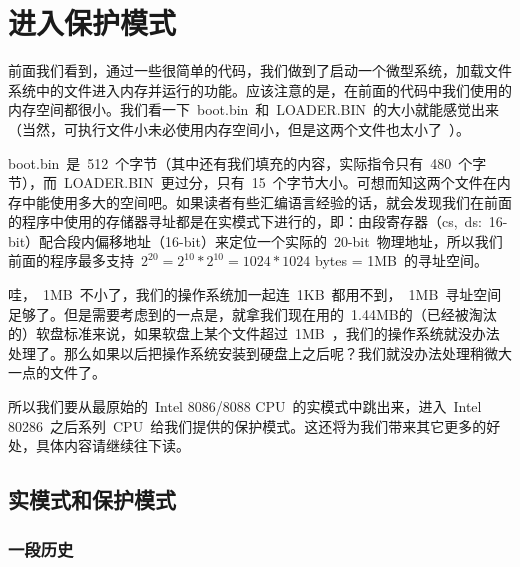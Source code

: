\chapter{进入保护模式} \label{CHpm}

前面我们看到，通过一些很简单的代码，我们做到了启动一个微型系统，加载文件系统中的文件进入内存并运行的功能。应该注意的是，在前面的代码中我们使用的内存空间都很小。我们看一下~boot.bin~和~LOADER.BIN~的大小就能感觉出来（当然，可执行文件小未必使用内存空间小，但是这两个文件也太小了~\smiley）。


boot.bin~是~512~个字节（其中还有我们填充的内容，实际指令只有~480~个字节），而~LOADER.BIN~更过分，只有~15~个字节大小。可想而知这两个文件在内存中能使用多大的空间吧。如果读者有些汇编语言经验的话，就会发现我们在前面的程序中使用的存储器寻址都是在实模式下进行的，即：由段寄存器（cs,~ds:~16-bit）配合段内偏移地址（16-bit）来定位一个实际的~20-bit~物理地址，所以我们前面的程序最多支持~$2^{20} = 2^{10}*2^{10} = 1024*1024$ bytes = 1MB~的寻址空间。

哇，~1MB~不小了，我们的操作系统加一起连~1KB~都用不到，~1MB~寻址空间足够了。但是需要考虑到的一点是，就拿我们现在用的~1.44MB的（已经被淘汰的）软盘标准来说，如果软盘上某个文件超过~1MB~，我们的操作系统就没办法处理了。那么如果以后把操作系统安装到硬盘上之后呢？我们就没办法处理稍微大一点的文件了。

所以我们要从最原始的~Intel 8086/8088 CPU~的实模式中跳出来，进入~Intel 80286~之后系列~CPU~给我们提供的保护模式。这还将为我们带来其它更多的好处，具体内容请继续往下读。

\section{实模式和保护模式}


\subsection{一段历史}


